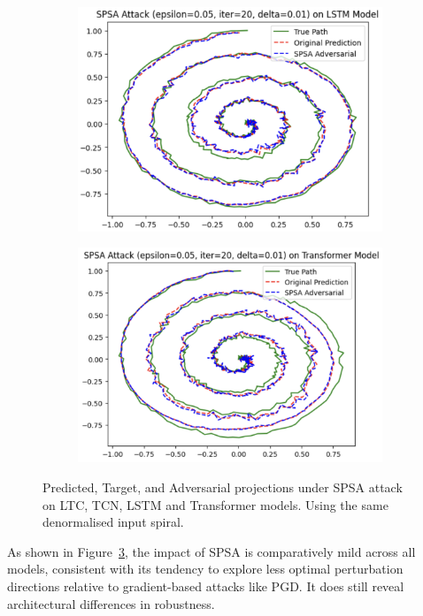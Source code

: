 \begin{figure}[H]
\begin{subfigure}[b]{0.45\linewidth}
        \includegraphics[width=\linewidth]{img/spsa_spiral_lstm.png}
        \label{fig:spsa_spiral_lstm}
    \end{subfigure}
    \hfill
    \begin{subfigure}[b]{0.45\linewidth}
        \includegraphics[width=\linewidth]{img/spsa_spiral_transformer.png}
        \label{fig:spsa_spiral_transformer}
    \end{subfigure}
    \caption{Predicted, Target, and Adversarial projections under SPSA attack on LTC, TCN, LSTM and Transformer models. Using the same denormalised input spiral.}
    \label{fig:spsa_spirals}
\end{figure}

As shown in Figure~\ref{fig:spsa_spirals}, the impact of SPSA is comparatively mild across all models, consistent with its tendency to explore less optimal perturbation directions relative to gradient-based attacks like PGD. It does still reveal architectural differences in robustness.


